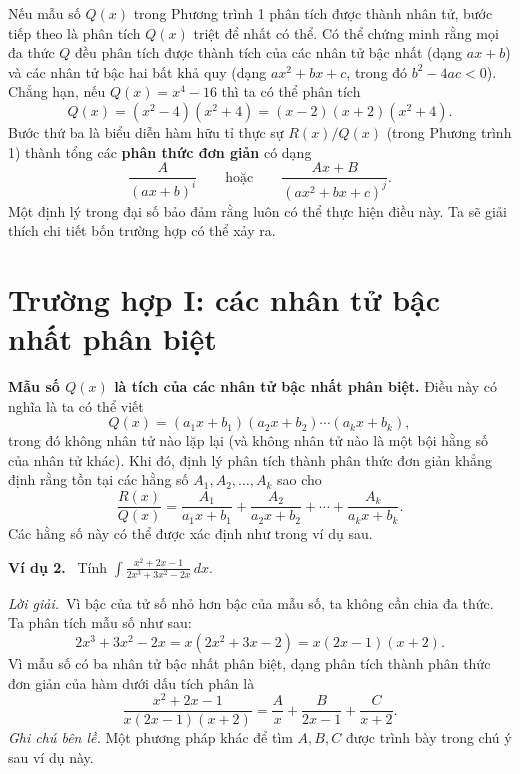 \documentclass[12pt,a4paper]{article}
\newcommand{\ex}[1]{\par\medskip\noindent\textbf{Ví dụ #1.}\ }
\newcommand{\sol}{\par\nopagebreak[4]\noindent\textit{Lời giải.}\ }
\begin{document}
Nếu mẫu số $Q(x)$ trong Phương trình 1 phân tích được thành nhân tử, bước tiếp theo là phân tích $Q(x)$ triệt để nhất có thể. Có thể chứng minh rằng mọi đa thức $Q$ đều phân tích được thành tích của các nhân tử bậc nhất (dạng $ax+b$) và các nhân tử bậc hai bất khả quy (dạng $ax^2+bx+c$, trong đó $b^2-4ac<0$). Chẳng hạn, nếu $Q(x)=x^4-16$ thì ta có thể phân tích
\[Q(x)=(x^2-4)(x^2+4)=(x-2)(x+2)(x^2+4).\]
Bước thứ ba là biểu diễn hàm hữu tỉ thực sự $R(x)/Q(x)$ (trong Phương trình 1) thành tổng các \textbf{phân thức đơn giản} có dạng
\[\frac{A}{(ax+b)^i}\qquad\text{hoặc}\qquad\frac{Ax+B}{(ax^2+bx+c)^j}.\]
Một định lý trong đại số bảo đảm rằng luôn có thể thực hiện điều này. Ta sẽ giải thích chi tiết bốn trường hợp có thể xảy ra.

\section*{Trường hợp I: các nhân tử bậc nhất phân biệt}
\textbf{Mẫu số $Q(x)$ là tích của các nhân tử bậc nhất phân biệt.} Điều này có nghĩa là ta có thể viết
\[Q(x)=(a_1x+b_1)(a_2x+b_2)\cdots(a_kx+b_k),\]
trong đó không nhân tử nào lặp lại (và không nhân tử nào là một bội hằng số của nhân tử khác). Khi đó, định lý phân tích thành phân thức đơn giản khẳng định rằng tồn tại các hằng số $A_1,A_2,\ldots,A_k$ sao cho
\begin{equation}\frac{R(x)}{Q(x)}=\frac{A_1}{a_1x+b_1}+\frac{A_2}{a_2x+b_2}+\cdots+\frac{A_k}{a_kx+b_k}.\tag{2}\end{equation}
Các hằng số này có thể được xác định như trong ví dụ sau.

\ex{2} Tính $\displaystyle\int\frac{x^2+2x-1}{2x^3+3x^2-2x}\,dx$.
\sol Vì bậc của tử số nhỏ hơn bậc của mẫu số, ta không cần chia đa thức. Ta phân tích mẫu số như sau:
\[2x^3+3x^2-2x=x(2x^2+3x-2)=x(2x-1)(x+2).\]
Vì mẫu số có ba nhân tử bậc nhất phân biệt, dạng phân tích thành phân thức đơn giản của hàm dưới dấu tích phân là
\begin{equation}\frac{x^2+2x-1}{x(2x-1)(x+2)}=\frac Ax+\frac B{2x-1}+\frac C{x+2}.\tag{3}\end{equation}
\textit{Ghi chú bên lề.} Một phương pháp khác để tìm $A,B,C$ được trình bày trong chú ý sau ví dụ này.
\end{document}
